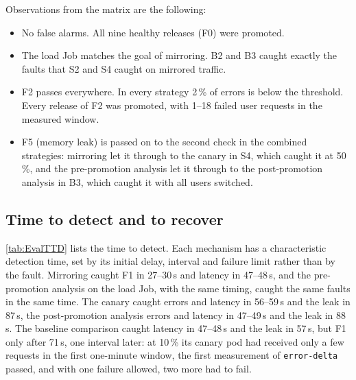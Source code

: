 Observations from the matrix are the following:
\begin{itemize}
	\item No false alarms. All nine healthy releases (F0) were promoted.
	\item The load Job matches the goal of mirroring. B2 and B3 caught exactly the faults that S2 and S4 caught on mirrored traffic.
	\item F2 passes everywhere. In every strategy 2\,\% of errors is below the threshold. Every release of F2 was promoted, with 1--18 failed user requests in the measured window.
	\item F5 (memory leak) is passed on to the second check in the combined strategies: mirroring let it through to the canary in S4, which caught it at 50\,\%, and the pre-promotion analysis let it through to the post-promotion analysis in B3, which caught it with all users switched.
\end{itemize}

\subsection{Time to detect and to recover}
\label{sec:EvalTTD}
\autoref{tab:EvalTTD} lists the time to detect. Each mechanism has a characteristic detection time, set by its initial delay, interval and failure limit rather than by the fault. Mirroring caught F1 in 27--30\,s and latency in 47--48\,s, and the pre-promotion analysis on the load Job, with the same timing, caught the same faults in the same time. The canary caught errors and latency in 56--59\,s and the leak in 87\,s, the post-promotion analysis errors and latency in 47--49\,s and the leak in 88\,s. The baseline comparison caught latency in 47--48\,s and the leak in 57\,s, but F1 only after 71\,s, one interval later: at 10\,\% its canary pod had received only a few requests in the first one-minute window, the first measurement of \texttt{error-delta} passed, and with one failure allowed, two more had to fail.

